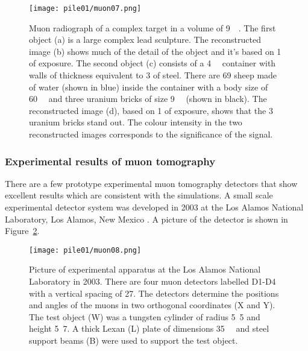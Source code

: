 \documentclass[twoside,titlepage,11pt,twocolumn,a4paper]{article}
\begin{document}
\begin{figure}
  \texttt{[image: pile01/muon07.png]}
  \caption{Muon radiograph of a complex target in a volume of
    \unit{9}{\cubic\metre}. The first object (a) is a
    large complex lead sculpture. The reconstructed image (b) shows
    much of the detail of the object and it’s based on
    \unit{1}{\minute} of exposure. The second object (c) consists of a
    \unit{4}{\cubic\metre} container with walls of
    thickness equivalent to \unit{3}{\milli\metre} of steel. There are
    69 sheep made of water (shown in blue) inside the container with a
    body size of \unit{60}{\cubic{\centi\metre}} and
    three uranium bricks of size
    \unit{9}{\cubic{\centi\metre}} (shown in
    black). The reconstructed image (d), based on \unit{1}{\minute} of
    exposure, shows that the 3 uranium bricks stand out. The colour
    intensity in the two reconstructed images corresponds to the
    significance of the signal. \citep{Priedhorsky2003}}
  \label{fig:muon07}
\end{figure}

\subsubsection{Experimental results of muon tomography}
There are a few prototype experimental muon tomography detectors that
show excellent results which are consistent with the simulations.  A
small scale experimental detector system was developed in 2003 at the
Los Alamos National Laboratory, Los Alamos, New Mexico
\citep{Priedhorsky2003}. A picture of the detector is shown in
Figure~\ref{fig:muon08}.

\begin{figure}
  \texttt{[image: pile01/muon08.png]}
  \caption{Picture of experimental apparatus at the Los Alamos
    National Laboratory in 2003. There are four muon detectors
    labelled D1-D4 with a vertical spacing of
    \unit{27}{\centi\metre}. The detectors determine the positions and
    angles of the muons in two orthogonal coordinates (X and Y). The
    test object (W) was a tungsten cylinder of radius
    \unit{5.5}{\centi\metre} and height \unit{5.7}{\centi\metre}. A
    thick Lexan (L) plate of dimensions
    \unit{35}{\cubic{\centi\metre}} and steel support
    beams (B) were used to support the test object. \citep{Priedhorsky2003}}
  \label{fig:muon08}
\end{figure}
\end{document}

